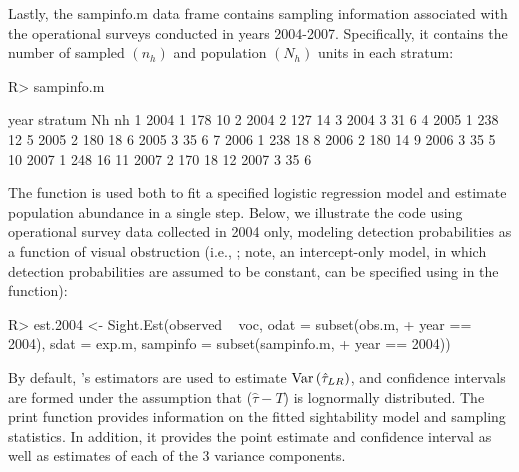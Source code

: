 \documentclass[nojss]{jss}
\def\VAR{{\rm Var}\,}
\begin{document}
Lastly, the sampinfo.m data frame contains sampling information
associated with the operational surveys conducted in years
2004-2007. Specifically, it contains the number of sampled $(n_{h})$
and population $(N_{h})$ units in each stratum:
\begin{Schunk}
\begin{Sinput}
R> sampinfo.m
\end{Sinput}
\begin{Soutput}
   year stratum  Nh nh
1  2004       1 178 10
2  2004       2 127 14
3  2004       3  31  6
4  2005       1 238 12
5  2005       2 180 18
6  2005       3  35  6
7  2006       1 238 18
8  2006       2 180 14
9  2006       3  35  5
10 2007       1 248 16
11 2007       2 170 18
12 2007       3  35  6
\end{Soutput}
\end{Schunk}
The  function is used both to fit a specified
logistic regression model and estimate population abundance in a
single step. Below, we illustrate the code using operational survey
data collected in 2004 only, modeling detection probabilities as a
function of visual obstruction (i.e., ; note, an
intercept-only model, in which  detection probabilities are assumed
to be constant, can be specified using  in the
 function):
\begin{Schunk}
\begin{Sinput}
R> est.2004 <- Sight.Est(observed ~ voc, odat = subset(obs.m,
+      year == 2004), sdat = exp.m, sampinfo = subset(sampinfo.m,
+      year == 2004))
\end{Sinput}
\end{Schunk}
By default, \citet{Wong1996}'s estimators are used to estimate
$\VAR(\hat{\tau}_{LR})$, and confidence intervals are formed under
the assumption that ($\hat{\tau}-T$) is lognormally distributed.
The print function provides information on the fitted sightability
model and sampling statistics. In addition, it provides the point
estimate and confidence interval as well as estimates of each of the
3 variance components.
\end{document}

